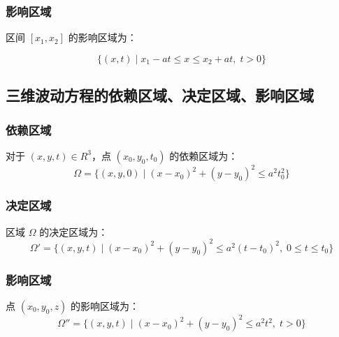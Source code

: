 \subsubsection{影响区域}

区间 $[x_1, x_2]$ 的影响区域为：

\[
\{ (x, t) \mid x_1 - at \leq x \leq x_2 + at, \; t > 0 \}
\]

\begin{figure}[h]
    \centering
\end{figure}    

\subsection{三维波动方程的依赖区域、决定区域、影响区域}

\subsubsection{依赖区域}
对于 $(x, y, t) \in R^3$，点 $(x_0, y_0, t_0)$ 的依赖区域为：
\[
\Omega = \{ (x, y, 0) \mid (x - x_0)^2 + (y - y_0)^2 \leq a^2 t_0^2 \}
\]

\subsubsection{决定区域}
区域 $\Omega$ 的决定区域为：
\[
\Omega' = \{ (x, y, t) \mid (x - x_0)^2 + (y - y_0)^2 \leq a^2(t - t_0)^2, \; 0 \leq t \leq t_0 \}
\]

\subsubsection{影响区域}
点 $(x_0, y_0, z)$ 的影响区域为：
\[
\Omega'' = \{ (x, y, t) \mid (x - x_0)^2 + (y - y_0)^2 \leq a^2 t^2, \; t > 0 \}
\]
